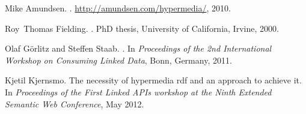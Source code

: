 \documentclass{article}
\begin{document}
\begin{thebibliography}{1}

Mike Amundsen.
.
\newblock \url{http://amundsen.com/hypermedia/}, 2010.

Roy~Thomas Fielding.
.
\newblock PhD thesis, {University of California, Irvine}, 2000.

Olaf G\"{o}rlitz and Steffen Staab.
.
\newblock In {\em Proceedings of the 2nd International Workshop on Consuming
  Linked Data}, Bonn, Germany, 2011.

Kjetil Kjernsmo.
\newblock The necessity of hypermedia rdf and an approach to achieve it.
\newblock In {\em Proceedings of the First Linked APIs workshop at the Ninth
  Extended Semantic Web Conference}, May 2012.

\end{thebibliography}
\end{document}
